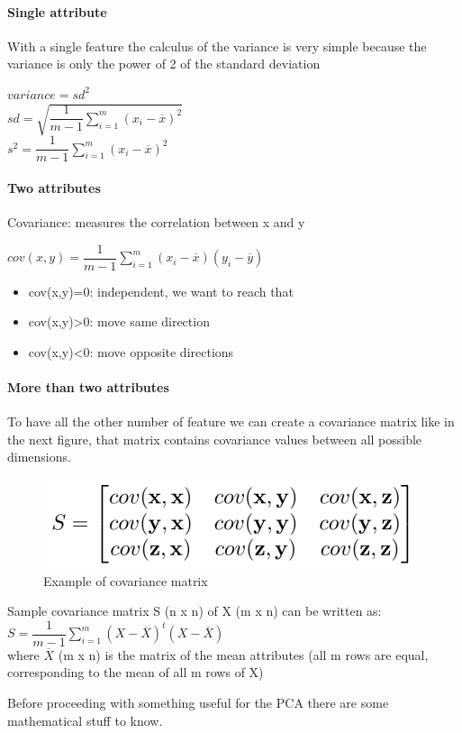 \paragraph{Single attribute}
With a single feature the calculus of the variance is very simple because the variance is only the power of 2 of the standard deviation
\begin{center}
    $variance = sd^2$\\
    $sd = \sqrt{\dfrac{1}{m-1} \sum\limits_{i=1}^m (x_i - \overline{x})^2}$ \\
    $s^2 = \dfrac{1}{m-1} \sum\limits_{i=1}^m (x_i - \overline{x})^2$
\end{center}
\paragraph{Two attributes}
Covariance: measures the correlation between x and y
\begin{center}
    $cov(x,y) = \dfrac{1}{m-1} \sum\limits_{i=1}^m (x_i - \overline{x}) (y_i - \overline{y})$
\end{center}
\begin{itemize}
    \item cov(x,y)=0: independent, we want to reach that
    \item cov(x,y)>0: move same direction
    \item cov(x,y)<0: move opposite directions
\end{itemize}
\paragraph{More than two attributes}
To have all the other number of feature we can create a covariance matrix like in the next figure, that matrix contains covariance values between all possible dimensions.
\begin{figure}[H]
    \centering
    \includegraphics{images/DimRed/PCA4.png}
    \caption{Example of covariance matrix}
    \label{fig:enter-label}
\end{figure}

\begin{center}
    Sample covariance matrix S (n x n) of X (m x n) can be written as:\\
    $ S = \dfrac{1}{m-1} \sum\limits_{i=1}^m (X - \overline{X})^t (X - \overline{X})$\\
    where $\overline{X}$ (m x n) is the matrix of the mean attributes (all m rows are equal, corresponding to the mean of all m rows of X)
\end{center}
Before proceeding with something useful for the PCA there are some mathematical stuff to know.

